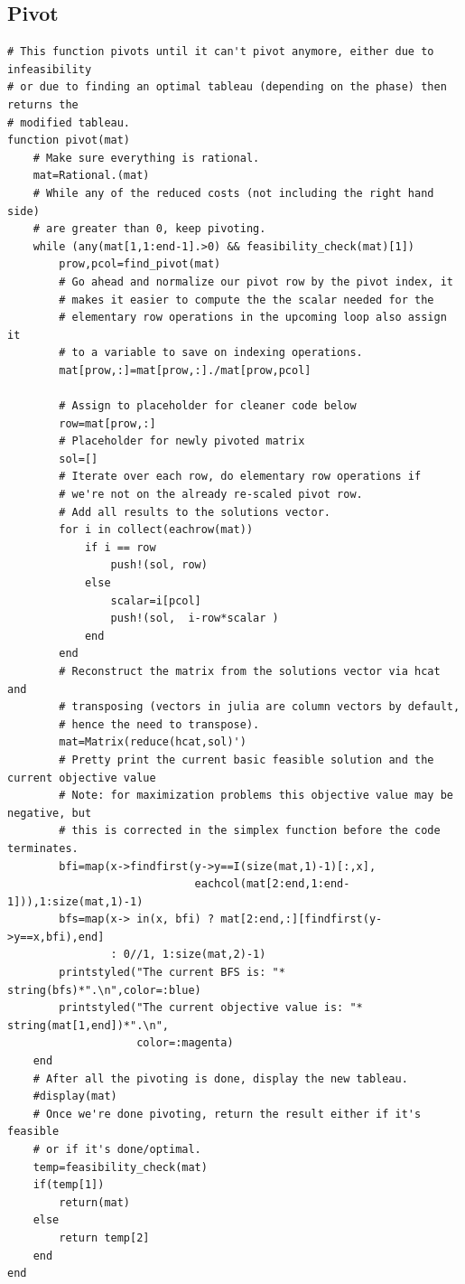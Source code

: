 \documentclass[11pt]{article}
\begin{document}
\subsection{Pivot}
\label{sec:org341b0f6}
\begin{verbatim}
# This function pivots until it can't pivot anymore, either due to infeasibility
# or due to finding an optimal tableau (depending on the phase) then returns the
# modified tableau.
function pivot(mat)
    # Make sure everything is rational.
    mat=Rational.(mat)
    # While any of the reduced costs (not including the right hand side)
    # are greater than 0, keep pivoting.
    while (any(mat[1,1:end-1].>0) && feasibility_check(mat)[1])
        prow,pcol=find_pivot(mat)
        # Go ahead and normalize our pivot row by the pivot index, it
        # makes it easier to compute the the scalar needed for the
        # elementary row operations in the upcoming loop also assign it
        # to a variable to save on indexing operations.
        mat[prow,:]=mat[prow,:]./mat[prow,pcol]

        # Assign to placeholder for cleaner code below
        row=mat[prow,:]
        # Placeholder for newly pivoted matrix
        sol=[]
        # Iterate over each row, do elementary row operations if
        # we're not on the already re-scaled pivot row.
        # Add all results to the solutions vector.
        for i in collect(eachrow(mat))
            if i == row
                push!(sol, row)
            else
                scalar=i[pcol]
                push!(sol,  i-row*scalar )
            end
        end
        # Reconstruct the matrix from the solutions vector via hcat and
        # transposing (vectors in julia are column vectors by default,
        # hence the need to transpose).
        mat=Matrix(reduce(hcat,sol)')
        # Pretty print the current basic feasible solution and the current objective value
        # Note: for maximization problems this objective value may be negative, but
        # this is corrected in the simplex function before the code terminates.
        bfi=map(x->findfirst(y->y==I(size(mat,1)-1)[:,x],
                             eachcol(mat[2:end,1:end-1])),1:size(mat,1)-1)
        bfs=map(x-> in(x, bfi) ? mat[2:end,:][findfirst(y->y==x,bfi),end]
                : 0//1, 1:size(mat,2)-1)
        printstyled("The current BFS is: "* string(bfs)*".\n",color=:blue)
        printstyled("The current objective value is: "* string(mat[1,end])*".\n",
                    color=:magenta)
    end
    # After all the pivoting is done, display the new tableau.
    #display(mat)
    # Once we're done pivoting, return the result either if it's feasible
    # or if it's done/optimal.
    temp=feasibility_check(mat)
    if(temp[1])
        return(mat)
    else
        return temp[2]
    end
end
\end{verbatim}
\end{document}

